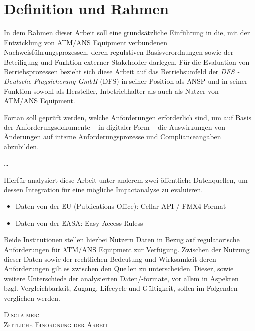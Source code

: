        
    \pagebreak
    \section{Definition und Rahmen}

        In dem Rahmen dieser Arbeit soll eine grundsätzliche Einführung in die, mit der Entwicklung von ATM/ANS Equipment verbundenen Nachweisführungsprozessen, deren regulativen Basisverordnungen sowie der Beteiligung und Funktion externer Stakeholder darlegen.
        Für die Evaluation von Betriebsprozessen bezieht sich diese Arbeit auf das Betriebsumfeld der \textit{DFS - Deutsche Flugsicherung GmbH} (DFS) in seiner Position als ANSP und in seiner Funktion sowohl als Hersteller, Inbetriebhalter als auch als Nutzer von ATM/ANS Equipment.

        Fortan soll geprüft werden, welche Anforderungen erforderlich sind, um auf Basis der Anforderungsdokumente -- in digitaler Form -- die Auswirkungen von Änderungen auf interne Anforderungsprozesse und Complianceangaben abzubilden.

    \dots



        Hierfür analysiert diese Arbeit unter anderem zwei öffentliche Datenquellen, um dessen Integration für eine mögliche Impactanalyse zu evaluieren.
        \begin{itemize}
            \item Daten von der EU (Publications Office): Cellar API / FMX4 Format
            \item Daten von der EASA: Easy Access Ruless
        \end{itemize}

        Beide Institutionen stellen hierbei Nutzern Daten in Bezug auf regulatorische Anforderungen für ATM/ANS Equipment zur Verfügung.
        Zwischen der Nutzung dieser Daten sowie der rechtlichen Bedeutung und Wirksamkeit deren Anforderungen gilt es zwischen den Quellen zu unterscheiden.
        Dieser, sowie weitere Unterschiede der analysierten Daten/-formate, vor allem in Aspekten bzgl. Vergleichbarkeit, Zugang, Lifecycle und Gültigkeit, sollen im Folgenden verglichen werden.

    

\begin{center}
    \textsc{Disclaimer: \\
    Zeitliche Einordnung der Arbeit}
\end{center}


